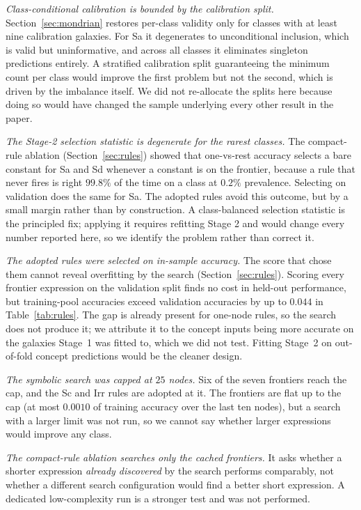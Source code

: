 \documentclass[11pt]{article}
\begin{document}
\emph{Class-conditional calibration is bounded by the calibration split.}
Section~\ref{sec:mondrian} restores per-class validity only for classes with
at least nine calibration galaxies. For Sa it degenerates to unconditional
inclusion, which is valid but uninformative, and across all classes it
eliminates singleton predictions entirely. A stratified calibration split
guaranteeing the minimum count per class would improve the first problem but
not the second, which is driven by the imbalance itself. We did not re-allocate
the splits here because doing so would have changed the sample underlying every
other result in the paper.

\emph{The Stage-2 selection statistic is degenerate for the rarest classes.}
The compact-rule ablation (Section~\ref{sec:rules}) showed that one-vs-rest
accuracy selects a bare constant for Sa and Sd whenever a constant is on the
frontier, because a rule that never fires is right $99.8\%$ of the time on a
class at $0.2\%$ prevalence. Selecting on validation does the same for Sa. The
adopted rules avoid this outcome, but by a small margin rather than by
construction. A class-balanced
selection statistic is the principled fix; applying it requires refitting
Stage 2 and would change every number reported here, so we identify the
problem rather than correct it.

\emph{The adopted rules were selected on in-sample accuracy.} The score that
chose them cannot reveal overfitting by the search (Section~\ref{sec:rules}).
Scoring every frontier expression on the validation split finds no cost in
held-out performance, but training-pool accuracies exceed validation accuracies
by up to $0.044$ in Table~\ref{tab:rules}. The gap is already present for one-node
rules, so the search does not produce it; we attribute it to the concept inputs
being more accurate on the galaxies Stage~1 was fitted to, which we did not
test. Fitting Stage~2 on out-of-fold concept predictions would be the cleaner
design.

\emph{The symbolic search was capped at $25$ nodes.} Six of the seven
frontiers reach the cap, and the Sc and Irr rules are adopted at it. The
frontiers are flat up to the cap (at most $0.0010$ of training accuracy over
the last ten nodes), but a search with a larger limit was not run, so we cannot
say whether larger expressions would improve any class.

\emph{The compact-rule ablation searches only the cached frontiers.} It asks
whether a shorter expression \emph{already discovered} by the search performs
comparably, not whether a different search configuration would find a better
short expression. A dedicated low-complexity run is a stronger test and was
not performed.
\end{document}
